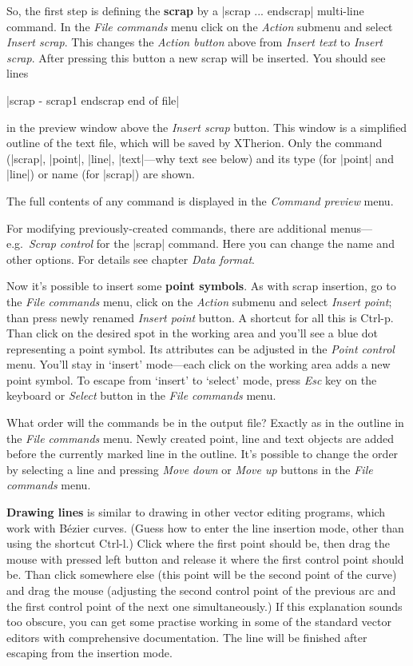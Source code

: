 So, the first step is defining the {\bf scrap} by a |scrap ... endscrap| 
multi-line command.  In the {\it File commands} menu click on the {\it Action} 
submenu and select {\it Insert scrap}. This changes the {\it Action button} 
above from {\it Insert text} to {\it Insert scrap}. After pressing this button a 
new scrap will be inserted. You should see lines

|scrap - scrap1
endscrap
end of file|

in the preview window above the {\it Insert scrap} button. This window is a 
simplified outline of the text file, which will be saved by XTherion. Only 
the command (|scrap|, |point|, |line|, |text|---why text see below) and its 
type (for |point| and |line|) or name (for |scrap|) are shown. 

The full contents of any command is displayed in the {\it Command preview} 
menu.

For modifying previously-created commands, there are additional 
menus---e.g.~{\it Scrap control} for the |scrap| command. Here you can 
change the name and other options. For details see chapter {\it Data format}.

Now it's possible to insert some {\bf point symbols}. As with scrap 
insertion, go to the {\it File commands} menu, click on the {\it Action} 
submenu and select {\it Insert point}; than press newly renamed {\it Insert 
point} button. A shortcut for all this is Ctrl-p. Than click on the desired 
spot in the working area and you'll see a blue dot representing a point 
symbol. Its attributes can be adjusted in the {\it Point control} menu.
You'll stay in `insert' mode---each click on the working area adds a new 
point symbol. To escape from `insert' to `select' mode, press {\it Esc} key 
on the keyboard or {\it Select} button in the {\it File commands} menu.

What order will the commands be in the output file? Exactly as in the 
outline in the {\it File commands} menu. Newly created point, line and text objects 
are added before the currently marked line in the outline. It's possible to 
change the order by selecting a line and pressing {\it Move down} or 
{\it Move up} buttons in the {\it File commands} menu.

{\bf Drawing lines} is similar to drawing in other 
vector editing programs, which work with B\'ezier curves. 
(Guess how to enter the line insertion mode, other than 
using the shortcut Ctrl-l.) Click where the first point should be, then drag the 
mouse with pressed left button and release it where the first control point 
should be. Than click somewhere else (this point will be the second point of 
the curve) and drag the mouse (adjusting the second control point of the 
previous arc and the first control point of the next one simultaneously.) If 
this explanation sounds too obscure, you can 
get some practise working in some of the standard vector editors with 
comprehensive documentation. The line will be finished after escaping from the 
insertion mode.

